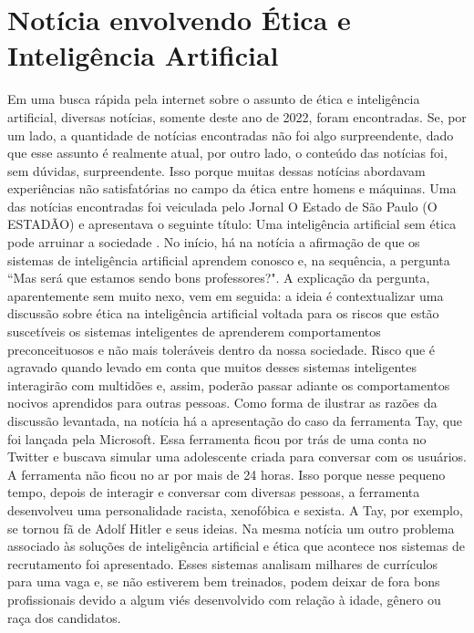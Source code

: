 \documentclass{article}
\begin{document}
%
\section*{Notícia envolvendo Ética e Inteligência Artificial}
Em uma busca rápida pela internet sobre o assunto de ética e inteligência artificial, diversas notícias, somente deste ano de 2022, foram encontradas. Se, por um lado, a quantidade de notícias encontradas não foi algo surpreendente, dado que esse assunto é realmente atual, por outro lado, o conteúdo das notícias foi, sem dúvidas, surpreendente. Isso porque muitas dessas notícias abordavam experiências não satisfatórias no campo da ética entre homens e máquinas. Uma das notícias encontradas foi veiculada pelo Jornal O Estado de São Paulo (O ESTADÃO) e apresentava o seguinte título: Uma inteligência artificial sem ética pode arruinar a sociedade \cite{Estadao_online}. No início, há na notícia a afirmação de que os sistemas de inteligência artificial aprendem conosco e, na sequência, a pergunta ``Mas será que estamos sendo bons professores?". A explicação da pergunta, aparentemente sem muito nexo, vem em seguida: a ideia é contextualizar uma discussão sobre ética na inteligência artificial voltada para os riscos que estão suscetíveis os sistemas inteligentes de aprenderem comportamentos preconceituosos e não mais toleráveis dentro da nossa sociedade. Risco que é agravado quando levado em conta que muitos desses sistemas inteligentes interagirão com multidões e, assim, poderão passar adiante os comportamentos nocivos aprendidos para outras pessoas. Como forma de ilustrar as razões da discussão levantada, na notícia há a apresentação do caso da ferramenta Tay, que foi lançada pela Microsoft. Essa ferramenta ficou por trás de uma conta no Twitter e buscava simular uma adolescente criada para conversar com os usuários. A ferramenta não ficou no ar por mais de 24 horas. Isso porque nesse pequeno tempo, depois de interagir e conversar com diversas pessoas, a ferramenta desenvolveu uma personalidade racista, xenofóbica e sexista. A Tay, por exemplo, se tornou fã de Adolf Hitler e seus ideias. Na mesma notícia um outro problema associado às soluções de inteligência artificial e ética que acontece nos sistemas de recrutamento foi apresentado. Esses sistemas analisam milhares de currículos para uma vaga e, se não estiverem bem treinados, podem deixar de fora bons profissionais devido a algum viés desenvolvido com relação à idade, gênero ou raça dos candidatos.

%
\end{document}
